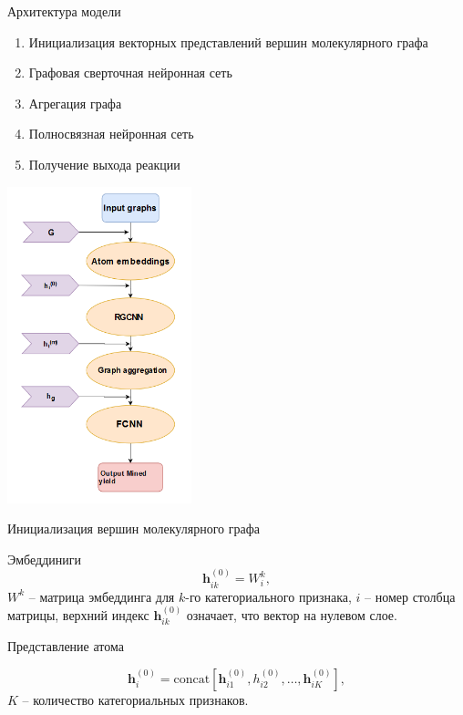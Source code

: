 \documentclass[11pt,pdf,hyperref={unicode}]{beamer}
\begin{document}
\begin{frame}{Архитектура модели}

\begin{multicols}
\normalsize

\begin{enumerate}
    \item Инициализация векторных представлений вершин молекулярного графа
    \item Графовая сверточная нейронная сеть
    \item Агрегация графа
    \item Полносвязная нейронная сеть
    \item Получение выхода реакции
\end{enumerate}
\columnbreak
\includegraphics[width=0.4\textwidth]{model.jpg}

\end{multicols}

\end{frame}

\begin{frame}{Инициализация вершин молекулярного графа}

\begin{block}{Эмбеддиниги}
$$\mathbf{h}_{ik}^{(0)} = W^k_i,$$ $W^k$ -- матрица эмбеддинга для $k$-го категориального признака, $i$ -- номер столбца матрицы, верхний индекс $\mathbf{h}_{ik}^{(0)}$ означает, что вектор на нулевом слое.
\end{block}
\begin{block}{Представление атома}

$$\mathbf{h}_{i}^{(0)} = \text{concat}[\mathbf{h}_{i1}^{(0)}, h_{i2}^{(0)}, \ldots, \mathbf{h}_{iK}^{(0)}],$$
$K$ -- количество категориальных признаков.

\end{block}
\end{frame}
\end{document}
